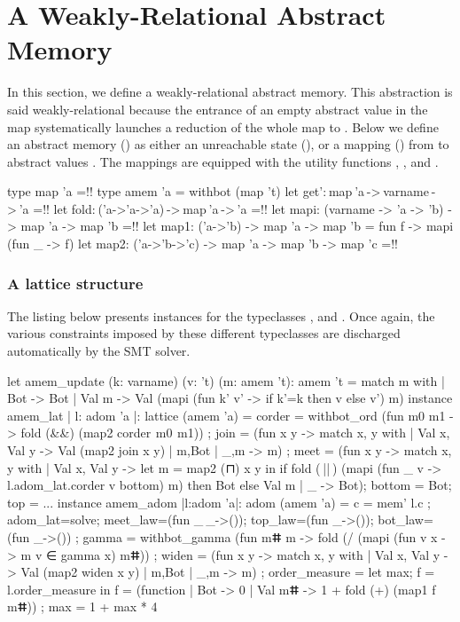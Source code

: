 \documentclass{llncs}
\begin{document}
\section{A Weakly-Relational Abstract Memory}
\label{abint:section:weakly-rel-amem}
%
In this section, we define a weakly-relational abstract memory.
%
This abstraction is said weakly-relational because the entrance of
an empty abstract value in the map systematically launches a
reduction of the whole map to .
%
Below we define an abstract memory () as either an
unreachable state (), or a mapping ()
from  to abstract values .
%
The mappings  are equipped with the utility
functions , ,  and
.
%
\begin{fstarcode}
type map 'a =!\shortdots!                 type amem 'a = withbot (map 't)
let get': map 'a -> varname -> 'a =!\shortdots!  let fold: ('a->'a->'a) -> map 'a -> 'a =!\shortdots!
let mapi: (varname -> 'a -> 'b) -> map 'a -> map 'b =!\shortdots!
let map1: ('a->'b) -> map 'a -> map 'b = fun f -> mapi (fun _ -> f)
let map2: ('a->'b->'c) -> map 'a -> map 'b -> map 'c =!\shortdots!
\end{fstarcode}
%
\subsubsection{A lattice structure}
The listing below presents  instances for the
typeclasses ,  and .
%
Once again, the various constraints imposed by these different
typeclasses are discharged automatically by the SMT solver.
%
\begin{fstarcode}
let amem_update (k: varname) (v: 't) (m: amem 't): amem 't
  = match m with | Bot -> Bot
    | Val m -> Val (mapi (fun k' v' -> if k'=k then v else v') m)
instance amem_lat {| l: adom 'a |}: lattice (amem 'a) =
  { corder = withbot_ord (fun m0 m1 -> fold (&&) (map2 corder  m0  m1))
  ; join = (fun x y -> match x, y with
      | Val x, Val y -> Val (map2 join x y) | m,Bot | _,m -> m)
  ; meet = (fun x y -> match x, y with
      | Val x, Val y ->
        let m = map2 (⊓) x y in
        if fold ( || ) (mapi (fun _ v -> l.adom_lat.corder v bottom) m)
        then Bot else Val m
      | _ -> Bot); bottom = Bot; top = ...}
instance amem_adom {|l:adom 'a|}: adom (amem 'a) = { c = mem' l.c
  ; adom_lat=solve; meet_law=(fun _ _->()); top_law=(fun _->()); bot_law=(fun _->())
  ; gamma = withbot_gamma (fun mⵌ m -> fold (/\) (mapi (fun v x -> m v ∈ gamma x) mⵌ))
  ; widen = (fun x y -> match x, y with
    | Val x, Val y -> Val (map2 widen x y) | m,Bot | _,m -> m)
  ; order_measure = let {max; f} = l.order_measure in
    { f = (function | Bot -> 0 | Val mⵌ -> 1 + fold (+) (map1 f mⵌ))
    ; max = 1 + max * 4 }}
\end{fstarcode}
%
\end{document}
